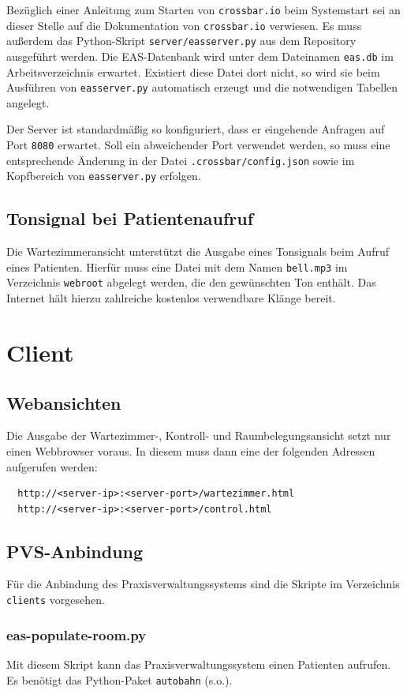 \documentclass[a4paper,10pt]{scrreprt}
\begin{document}
Bezüglich einer Anleitung zum Starten von \texttt{crossbar.io} beim Systemstart sei an dieser Stelle auf die Dokumentation von \texttt{crossbar.io} verwiesen. Es muss außerdem das Python-Skript \texttt{server/easserver.py} aus dem Repository ausgeführt werden.
Die EAS-Datenbank wird unter dem Dateinamen \texttt{eas.db} im Arbeitsverzeichnis erwartet. Existiert diese Datei dort nicht, so wird sie beim Ausführen von \texttt{easserver.py} automatisch erzeugt und die notwendigen Tabellen angelegt.

Der Server ist standardmäßig so konfiguriert, dass er eingehende Anfragen auf Port \texttt{8080} erwartet. Soll ein abweichender Port verwendet werden, so muss eine entsprechende Änderung in der Datei \texttt{.crossbar/config.json} sowie im Kopfbereich von \texttt{easserver.py} erfolgen.

\subsection{Tonsignal bei Patientenaufruf}
\label{ssec:tonsignal}
Die Wartezimmeransicht unterstützt die Ausgabe eines Tonsignals beim Aufruf eines Patienten. Hierfür muss eine Datei mit dem Namen \texttt{bell.mp3} im Verzeichnis \texttt{webroot} abgelegt werden, die den gewünschten Ton enthält. Das Internet hält hierzu zahlreiche kostenlos verwendbare Klänge bereit.

\section{Client}
\subsection{Webansichten}
Die Ausgabe der Wartezimmer-, Kontroll- und Raumbelegungsansicht setzt nur einen Webbrowser voraus. In diesem muss dann eine der folgenden Adressen aufgerufen werden:
\begin{lstlisting}
  http://<server-ip>:<server-port>/wartezimmer.html
  http://<server-ip>:<server-port>/control.html
\end{lstlisting}

\subsection{PVS-Anbindung}
Für die Anbindung des Praxisverwaltungssystems sind die Skripte im Verzeichnis \texttt{clients} vorgesehen. 
\subsubsection{eas-populate-room.py}
Mit diesem Skript kann das Praxisverwaltungssystem einen Patienten aufrufen. Es benötigt das Python-Paket \texttt{autobahn} (s.o.).
\end{document}
